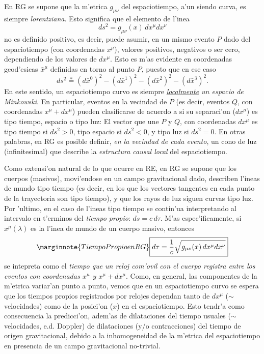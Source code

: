 En RG se supone que la m'etrica $g_{\mu\nu}$ del espaciotiempo, a'un siendo curva, es siempre
\textit{lorentziana}. Esto significa que el elemento de l'inea
\begin{equation}\label{dsymet}
 ds^2=g_{\mu\nu}(x)\,dx^\mu dx^\nu
\end{equation}
no es definido positivo, es decir, puede asumir, en un mismo evento $P$ dado del espaciotiempo (con coordenadas $x^\mu$), valores positivos, negativos o ser cero,
dependiendo de los valores de $dx^\mu$. Esto es m'as evidente en coordenadas
geod'esicas $\bar{x}^\mu$ definidas en torno al punto $P$, puesto que en ese caso
\begin{equation}
 ds^2\stackrel{*}{=}(d\bar{x}^0)^2-(d\bar{x}^1)^2-(d\bar{x}^2)^2-(d\bar{x}^3)^2.
\end{equation}
En este sentido, un espaciotiempo curvo es siempre
\textit{\underline{localmente} un espacio de Minkowski}. En particular, eventos
en la vecindad de $P$ (es decir, eventos $Q$, con coordenadas $x^\mu+dx^\mu$)
pueden clasificarse de acuerdo a si su separaci'on ($dx^\mu$) es tipo tiempo,
espacio o tipo luz: El vector que une $P$ y $Q$, con coordenadas $dx^\mu$ es
tipo tiempo si $ds^2>0$, tipo espacio si $ds^2<0$, y tipo luz si $ds^2=0$. En
otras palabras, en RG es posible definir, \textit{en la vecindad de cada evento}, un cono de luz (infinitesimal) que describe la \textit{estructura causal local} del espaciotiempo.

Como extensi'on natural de lo que ocurre en RE, en RG se supone que los cuerpos  (masivos), movi'endose en un campo gravitacional dado, describen
l'ineas de mundo tipo tiempo (es decir, en los que los vectores
tangentes en cada punto de la trayectoria son tipo tiempo), y que los rayos de luz
siguen curvas tipo luz. Por 'ultimo, en el caso de l'ineas tipo tiempo se
contin'ua interpretando al intervalo en t'erminos del \textit{tiempo propio}:
$ds=c\,d\tau$. M'as espec'ificamente, si $x^\mu(\lambda)$ es la l'inea de mundo
de un cuerpo masivo, entonces
\begin{equation}\marginnote{Tiempo Propio en RG}
\boxed{ d\tau=\frac{1}{c}\sqrt{g_{\mu\nu}(x)\,dx^\mu
dx^\nu}}
\end{equation}
se intepreta como el \textit{tiempo que un reloj com'ovil con el cuerpo registra
entre los eventos con coordenadas $x^\mu$ y $x^\mu+dx^\mu$}. Como, en general,
las componentes de la m'etrica variar'an punto a punto, vemos que en un
espaciotiempo curvo se espera que los tiempos propios registrados por relojes
dependan tanto de ${dx^\mu}$ ($\sim$ velocidades) como de la
posici'on ($x$) en el espaciotiempo. Esto tendr'a como consecuencia la
predicci'on, adem'as de dilataciones del tiempo usuales ($\sim$ velocidades, e.d. Doppler) de dilataciones (y/o contracciones) del tiempo de origen gravitacional, debido a
la inhomogeneidad de la m'etrica del espaciotiempo en presencia de un campo gravitacional
no-trivial.

